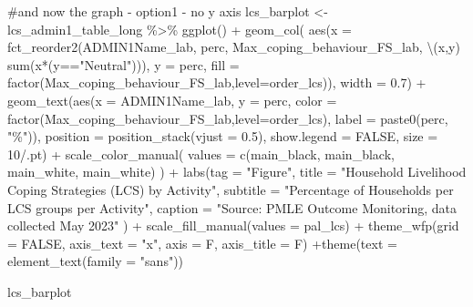 \documentclass[
  letterpaper,
  DIV=11,
  numbers=noendperiod]{scrreprt}
\newenvironment{Shaded}{\begin{snugshade}}{\end{snugshade}}
\newcommand{\AttributeTok}[1]{\textcolor[rgb]{0.40,0.45,0.13}{#1}}
\newcommand{\CommentTok}[1]{\textcolor[rgb]{0.37,0.37,0.37}{#1}}
\newcommand{\ConstantTok}[1]{\textcolor[rgb]{0.56,0.35,0.01}{#1}}
\newcommand{\DecValTok}[1]{\textcolor[rgb]{0.68,0.00,0.00}{#1}}
\newcommand{\FloatTok}[1]{\textcolor[rgb]{0.68,0.00,0.00}{#1}}
\newcommand{\FunctionTok}[1]{\textcolor[rgb]{0.28,0.35,0.67}{#1}}
\newcommand{\NormalTok}[1]{\textcolor[rgb]{0.00,0.23,0.31}{#1}}
\newcommand{\OtherTok}[1]{\textcolor[rgb]{0.00,0.23,0.31}{#1}}
\newcommand{\SpecialCharTok}[1]{\textcolor[rgb]{0.37,0.37,0.37}{#1}}
\newcommand{\StringTok}[1]{\textcolor[rgb]{0.13,0.47,0.30}{#1}}
\begin{document}
\begin{Shaded}
\begin{Highlighting}[]
\CommentTok{\#and now the graph {-} option1 {-} no y axis }
\NormalTok{lcs\_barplot }\OtherTok{\textless{}{-}}\NormalTok{ lcs\_admin1\_table\_long }\SpecialCharTok{\%\textgreater{}\%} 
  \FunctionTok{ggplot}\NormalTok{() }\SpecialCharTok{+}
  \FunctionTok{geom\_col}\NormalTok{(}
    \FunctionTok{aes}\NormalTok{(}\AttributeTok{x =} \FunctionTok{fct\_reorder2}\NormalTok{(ADMIN1Name\_lab,}
\NormalTok{                         perc,  }
\NormalTok{                         Max\_coping\_behaviour\_FS\_lab,}
\NormalTok{                         \textbackslash{}(x,y) }\FunctionTok{sum}\NormalTok{(x}\SpecialCharTok{*}\NormalTok{(y}\SpecialCharTok{==}\StringTok{"Neutral"}\NormalTok{))), }
        \AttributeTok{y =}\NormalTok{ perc,}
        \AttributeTok{fill =} \FunctionTok{factor}\NormalTok{(Max\_coping\_behaviour\_FS\_lab,}\AttributeTok{level=}\NormalTok{order\_lcs)), }
    \AttributeTok{width =} \FloatTok{0.7}\NormalTok{) }\SpecialCharTok{+}
  \FunctionTok{geom\_text}\NormalTok{(}\FunctionTok{aes}\NormalTok{(}\AttributeTok{x =}\NormalTok{ ADMIN1Name\_lab,}
                \AttributeTok{y =}\NormalTok{ perc,}
                \AttributeTok{color =} \FunctionTok{factor}\NormalTok{(Max\_coping\_behaviour\_FS\_lab,}\AttributeTok{level=}\NormalTok{order\_lcs),}
                \AttributeTok{label =} \FunctionTok{paste0}\NormalTok{(perc, }\StringTok{"\%"}\NormalTok{)),}
            \AttributeTok{position =} \FunctionTok{position\_stack}\NormalTok{(}\AttributeTok{vjust =} \FloatTok{0.5}\NormalTok{),}
            \AttributeTok{show.legend =} \ConstantTok{FALSE}\NormalTok{,}
            \AttributeTok{size =} \DecValTok{10}\SpecialCharTok{/}\NormalTok{.pt) }\SpecialCharTok{+}
  \FunctionTok{scale\_color\_manual}\NormalTok{(}
    \AttributeTok{values =} \FunctionTok{c}\NormalTok{(main\_black, main\_black, main\_white, main\_white)}
\NormalTok{  ) }\SpecialCharTok{+}
  \FunctionTok{labs}\NormalTok{(}\AttributeTok{tag =} \StringTok{"Figure"}\NormalTok{,}
       \AttributeTok{title =} \StringTok{"Household Livelihood Coping Strategies (LCS) by Activity"}\NormalTok{,}
       \AttributeTok{subtitle =} \StringTok{"Percentage of Households per LCS groups per Activity"}\NormalTok{,}
       \AttributeTok{caption =} \StringTok{"Source: PMLE Outcome Monitoring, data collected May 2023"}
\NormalTok{  ) }\SpecialCharTok{+}  \FunctionTok{scale\_fill\_manual}\NormalTok{(}\AttributeTok{values =}\NormalTok{ pal\_lcs) }\SpecialCharTok{+} \FunctionTok{theme\_wfp}\NormalTok{(}\AttributeTok{grid =} \ConstantTok{FALSE}\NormalTok{, }\AttributeTok{axis\_text =} \StringTok{"x"}\NormalTok{, }\AttributeTok{axis =}\NormalTok{ F, }\AttributeTok{axis\_title =}\NormalTok{ F) }\SpecialCharTok{+}\FunctionTok{theme}\NormalTok{(}\AttributeTok{text =} \FunctionTok{element\_text}\NormalTok{(}\AttributeTok{family =} \StringTok{"sans"}\NormalTok{)) }

\NormalTok{lcs\_barplot}
\end{Highlighting}
\end{Shaded}
\end{document}
